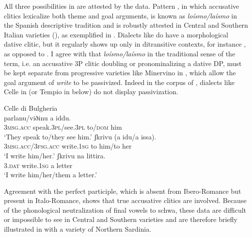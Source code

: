 \documentclass[output=paper,colorlinks,citecolor=brown,nonflat]{./langscibook}
\begin{document}
All three possibilities in  are attested by the data. Pattern , in which accusative clitics lexicalize both theme and goal arguments, is known as \textit{loísmo/laísmo} in the Spanish descriptive tradition and is robustly attested in Central and Southern Italian varieties (\citealt[§633]{Rohlfs1969}), as exemplified in . Dialects like  do have a morphological dative clitic, but it regularly shows up only in ditransitive contexts, for instance , as opposed to . I agree with \citet{Pineda2016} that \textit{loísmo/laísmo} in the traditional sense of the term, i.e. an accusative 3P clitic doubling or pronominalizing a dative DP, must be kept separate from progressive varieties like Minervino in , which allow the goal argument of \textit{write} to be passivized. Indeed in the corpus of \citet{ManziniSavoia2005}, dialects like Celle in  (or Tempio in  below) do not display passivization. 

\ea%
    \label{ex:manzini:21}
    Celle di Bulgheria \citep{ManziniSavoia2005}\\
    \ea\label{ex:manzini:21a} 
        {parlanu/viðinu}   {a}   {iddu}.\\
        \textsc{3msg.acc}  speak.\textsc{3pl}/see.\textsc{3pl} to/\textsc{dom} him\\
    \glt ‘They speak to/they see him.’
    \ex\label{ex:manzini:21b} 
           {ʃkrivu}     (a {idu/a} issa).\\
        \textsc{3msg.acc/3fsg.acc} write.\textsc{1sg}   to him/to her\\
    \glt ‘I write him/her.’  
    \ex\label{ex:manzini:21c} 
       {ʃkrivu}     {na} {littira}.\\
        \textsc{3.dat}   write.\textsc{1sg}   a letter\\
    \glt ‘I write him/her/them a letter.’
    \z
\z


Agreement with the perfect participle, which is absent from Ibero-Romance but present in Italo-Romance, shows that true accusative clitics are involved. Because of the phonological neutralization of final vowels to schwa, these data are difficult or impossible to see in Central and Southern varieties and are therefore briefly illustrated in  with a variety of Northern Sardinia.%
\end{document}
